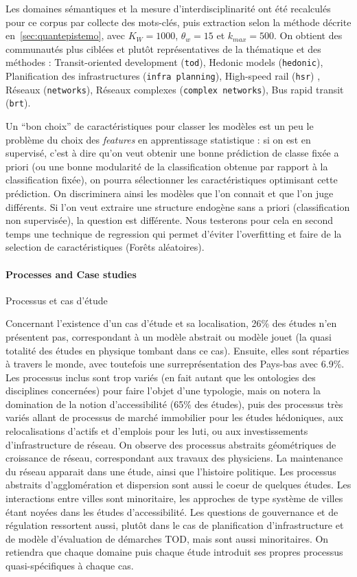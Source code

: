 Les domaines sémantiques et la mesure d'interdisciplinarité ont été recalculés pour ce corpus par collecte des mots-clés, puis extraction selon la méthode décrite en~\ref{sec:quantepistemo}, avec $K_W=1000$, $\theta_w=15$ et $k_{max}=500$. On obtient des communautés plus ciblées et plutôt représentatives de la thématique et des méthodes : Transit-oriented development (\texttt{tod}), Hedonic models (\texttt{hedonic}), Planification des infrastructures (\texttt{infra planning}), High-speed rail (\texttt{hsr}) , Réseaux (\texttt{networks}), Réseaux complexes (\texttt{complex networks}), Bus rapid transit (\texttt{brt}).


Un ``bon choix'' de caractéristiques pour classer les modèles est un peu le problème du choix des \emph{features} en apprentissage statistique : si on est en supervisé, c'est à dire qu'on veut obtenir une bonne prédiction de classe fixée a priori (ou une bonne modularité de la classification obtenue par rapport à la classification fixée), on pourra sélectionner les caractéristiques optimisant cette prédiction. On discriminera ainsi les modèles que l'on connait et que l'on juge différents. Si l'on veut extraire une structure endogène sans a priori (classification non supervisée), la question est différente. Nous testerons pour cela en second temps une technique de regression qui permet d'éviter l'overfitting et faire de la selection de caractéristiques (Forêts aléatoires).



\paragraph{Processes and Case studies}{Processus et cas d'étude}

Concernant l'existence d'un cas d'étude et sa localisation, 26\% des études n'en présentent pas, correspondant à un modèle abstrait ou modèle jouet (la quasi totalité des études en physique tombant dans ce cas). Ensuite, elles sont réparties à travers le monde, avec toutefois une surreprésentation des Pays-bas avec 6.9\%. Les processus inclus sont trop variés (en fait autant que les ontologies des disciplines concernées) pour faire l'objet d'une typologie, mais on notera la domination de la notion d'accessibilité (65\% des études), puis des processus très variés allant de processus de marché immobilier pour les études hédoniques, aux relocalisations d'actifs et d'emplois pour les luti, ou aux investissements d'infrastructure de réseau. On observe des processus abstraits géométriques de croissance de réseau, correspondant aux travaux des physiciens. La maintenance du réseau apparait dans une étude, ainsi que l'histoire politique. Les processus abstraits d'agglomération et dispersion sont aussi le coeur de quelques études. Les interactions entre villes sont minoritaire, les approches de type système de villes étant noyées dans les études d'accessibilité. Les questions de gouvernance et de régulation ressortent aussi, plutôt dans le cas de planification d'infrastructure et de modèle d'évaluation de démarches TOD, mais sont aussi minoritaires. On retiendra que chaque domaine puis chaque étude introduit ses propres processus quasi-spécifiques à chaque cas.



